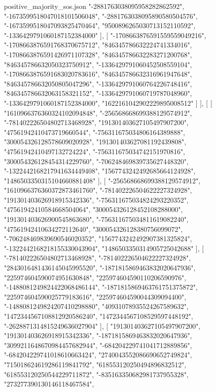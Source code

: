 \begin{filecontents*}[overwrite]{positive_majority_sos.json}
    "-2881763038095958282862592",
    "-1673599518047018101506048",
    "-2881763038095890580504576",
    "-1673599518047093825470464",
    "9500896265030713152110592",
    "-1336429791060187152384000"
   ],
   [
    "-1708663876591559559049216",
    "-1708663876591768370675712",
    "846345786632224741334016",
    "-1708663876591426971107328",
    "846345786632283271200768",
    "846345786632050323750912",
    "-1336429791060452508559104",
    "-1708663876591683020783616",
    "846345786632316961947648",
    "846345786632050805047296",
    "-1336429791060764226748416",
    "846345786632063158321152",
    "-1336429791060719787048960",
    "-1336429791060187152384000",
    "1622161042902229895008512"
   ]
  ],
  [
   [
    "1610966376360324102094848",
    "-256568668699388129574912",
    "-781402226504802713468928",
    "191301403627105497907200",
    "47561942410473719660544",
    "-756311675034806164389888",
    "300054326128578609020928",
    "191301403627081192439808",
    "47561942410497132724224",
    "-756311675034742151970816",
    "300054326128454314229760",
    "-706248469839735627448320",
    "-1322442168217941634449408",
    "1567743242492685664124928",
    "1486503350315104660881408"
   ],
   [
    "-256568668699388129574912",
    "1610966376360372873461760",
    "-781402226504622227324928",
    "191301403626918915342336",
    "-756311675034824293220352",
    "47561942410584668504064",
    "300054326128452108288000",
    "191301403626900545863680",
    "-756311675034811619082240",
    "47561942410634272112640",
    "300054326128380756099072",
    "-706248469839690546020352",
    "1567743242492907381325824",
    "-1322442168218155330043904",
    "1486503350314905725042688"
   ],
   [
    "-781402226504802713468928",
    "-781402226504622227324928",
    "2843016481436145045995520",
    "-1871815869463832020647936",
    "225974604590074951630848",
    "225974604590110206590976",
    "-1488081249824422068486144",
    "-1871815869463761751375872",
    "225974604590025779183616",
    "225974604590044309094400",
    "-1488081249824207410298880",
    "40931078935524267589632",
    "1472344567108812920586240",
    "1472344567108529597448192",
    "-2628871314815249636027904"
   ],
   [
    "191301403627105497907200",
    "191301403626918915342336",
    "-1871815869463832020647936",
    "3099211648670984457682944",
    "-684204229741041712889856",
    "-684204229741018610663424",
    "2740043552086690652749824",
    "715018624619286119841792",
    "618553120250494896832512",
    "618553120250544229711872",
    "-835163350682981737955328",
    "273277390130146118467584",

\end{filecontents*}
